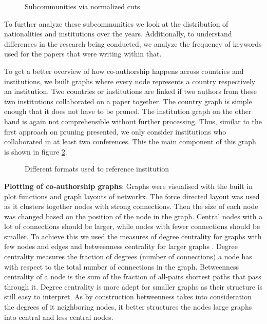 \documentclass[journal,twocolumn]{IEEEtran}
\begin{document}
    \begin{figure}
        \begin{center}\end{center}
        \caption{Subcommunities via normalized cuts}
        \label{normalized}
    \end{figure}
    
    To further analyze these subcommunities we look at the distribution of
nationalities and institutions over the years. Additionally, to
understand differences in the research being conducted, we analyze the
frequency of keywords used for the papers that were writing within that.

To get a better overview of how co-authorship happens across countries
and institutions, we built graphs where every node represents a country
respectively an institution. Two countries or institutions are linked if
two authors from these two institutions collaborated on a paper
together. The country graph is simple enough that it does not have to be
pruned. The institution graph on the other hand is again not
comprehensible without further processing. Thus, similar to the first
approach on pruning presented, we only consider institutions who
collaborated in at least two conferences. This the main component of
this graph is shown in figure \ref{unigraph}.


    \begin{figure}
        \begin{center}\end{center}
        \caption{Different formats used to reference institution}
        \label{unigraph}
    \end{figure}
    
    \textbf{Plotting of co-authorship graphs}: Graphs were visualised with
the built in plot functions and graph layouts of networkx. The force
directed layout was used as it clusters together nodes with strong
connections. Then the size of each node was changed based on the
position of the node in the graph. Central nodes with a lot of
connections should be larger, while nodes with fewer connections should
be smaller. To achieve this we used the measures of degree centrality
for graphs with few nodes and edges and betweenness centrality for
larger graphs . Degree centrality measures the fraction of degrees
(number of connections) a node has with respect to the total number of
connections in the graph. Betweenness centrality of a node is the sum of
the fraction of all-pairs shortest paths that pass through it. Degree
centrality is more adept for smaller graphs as their structure is still
easy to interpret. As by construction betweenness takes into
consideration the degrees of it neighboring nodes, it better structures
the nodes large graphs into central and less central nodes.
\end{document}
